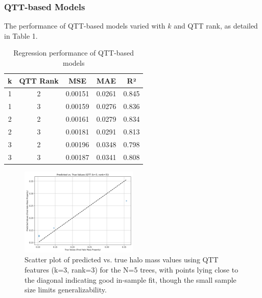 \documentclass[twocolumn]{aastex631}
\begin{document}
\subsubsection{QTT-based Models}
The performance of QTT-based models varied with $k$ and QTT rank, as detailed in Table 1.

\begin{table}[h!]
    \centering
    \caption{Regression performance of QTT-based models}
    \begin{tabular}{c c c c c}
        \hline
        k & QTT Rank & MSE & MAE & R² \\
        \hline
        1 & 2 & 0.00151 & 0.0261 & 0.845 \\
        1 & 3 & 0.00159 & 0.0276 & 0.836 \\
        2 & 2 & 0.00161 & 0.0279 & 0.834 \\
        2 & 3 & 0.00181 & 0.0291 & 0.813 \\
        3 & 2 & 0.00196 & 0.0348 & 0.798 \\
        3 & 3 & 0.00187 & 0.0341 & 0.808 \\
        \hline
    \end{tabular}
\end{table}

\begin{figure}[h!]
    \centering
    \includegraphics[width=0.5\textwidth]{../input_files/plots/pred_vs_true_qtt_k3_r3_19_20250524-175150.png}
    \caption{Scatter plot of predicted vs. true halo mass values using QTT features (k=3, rank=3) for the N=5 trees, with points lying close to the diagonal indicating good in-sample fit, though the small sample size limits generalizability.
}
    \label{fig:pred_vs_true_qtt}
\end{figure}
\end{document}

